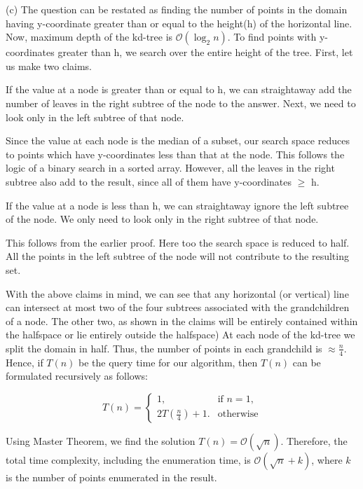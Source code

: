 \documentclass[assign]{article}
\begin{document}
\noindent (c) The question can be restated as finding the number of points in the domain having y-coordinate greater than or equal to the height(h) of the horizontal line. Now, maximum depth of the kd-tree is $\mathcal{O}(\log_{2} n)$. To find points with y-coordinates greater than h, we search over the entire height of the tree. First, let us make two claims.

 If the value at a node is greater than or equal to h, we can straightaway add the number of leaves in the right subtree of the node to the answer. Next, we need to look only in the left subtree of that node.

  Since the value at each node is the median of a subset, our search space reduces to points which have y-coordinates less than that at the node. This follows the logic of a binary search in a sorted array. However, all the leaves in the right subtree also add to the result, since all of them have y-coordinates $\ge$ h.

 If the value at a node is less than h, we can straightaway ignore the left subtree of the node. We only need to look only in the right subtree of that node.

 This follows from the earlier proof.  Here too the search space is reduced to half. All the points in the left subtree of the node will not contribute to the resulting set. 

\noindent With the above claims in mind, we can see that any horizontal (or vertical) line can intersect at most two of the four subtrees associated with the grandchildren of a node. The other two, as shown in the claims will be entirely contained within the halfspace or lie entirely outside the halfspace) At each node of the kd-tree we split the domain in half. Thus, the number of points in each grandchild is $\approx \frac{n}{4}$. Hence, if $T(n)$ be the query time for our algorithm, then $T(n)$ can be formulated recursively as follows:

\begin{equation*}
    T(n) = 
       \begin{cases}
		1, & \mbox{if $n = 1$}, \\
	    2T(\frac{n}{4}) + 1. & \mbox{otherwise}
       \end{cases}
\end{equation*}

\noindent Using Master Theorem, we find the solution  $T(n) = \mathcal{O}(\sqrt{n})$. Therefore, the total time complexity, including the enumeration time, is $\mathcal{O}(\sqrt{n} + k)$, where $k$ is the number of points enumerated in the result.
\end{document}
